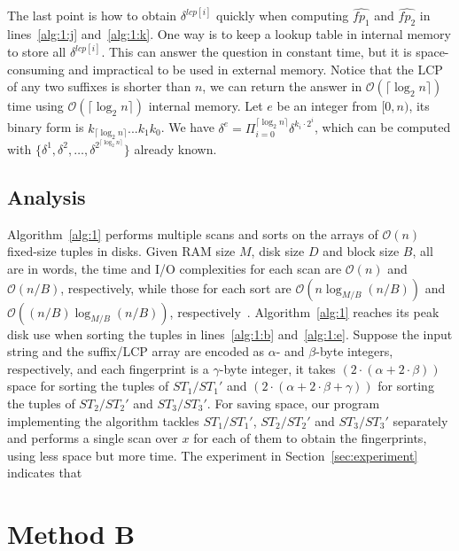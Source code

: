 \documentclass[10pt,journal,compsoc]{IEEEtran}
\begin{document}
The last point is how to obtain $\delta^{lcp[i]}$ quickly when computing $\hat{fp_1}$ and $\hat{fp_2}$ in lines~\ref{alg:1:j} and~\ref{alg:1:k}. One way is to keep a lookup table in internal memory to store all $\delta^{lcp[i]}$. This can answer the question in constant time, but it is space-consuming and impractical to be used in external memory. Notice that the LCP of any two suffixes is shorter than $n$, we can return the answer in $\mathcal{O}(\lceil \log_2{n} \rceil)$ time using $\mathcal{O}(\lceil \log_2{n} \rceil)$ internal memory. Let $e$ be an integer from $[0, n)$, its binary form is $k_{\lceil \log_2{n} \rceil}...k_1k_0$. We have $\delta^e = \Pi_{i = 0}^{\lceil \log_2{n} \rceil}{\delta}^{k_i \cdot 2^i}$, which can be computed with $\{{\delta}^{1}, {\delta}^{2}, \dots, {\delta}^{2^{\lceil \log_2{n} \rceil}} \}$ already known.

\subsection{Analysis} \label{sec:method1:analysis}


Algorithm~\ref{alg:1} performs multiple scans and sorts on the arrays of $\mathcal{O}(n)$ fixed-size tuples in disks. Given RAM size $M$, disk size $D$ and block size $B$, all are in words, the time and I/O complexities for each scan are $\mathcal{O}(n)$ and $\mathcal{O}(n / B)$, respectively, while those for each sort are $\mathcal{O}(n\log_{M/ B}(n / B))$ and $\mathcal{O}((n / B)\log_{M / B}(n / B))$, respectively~\cite{Arge2013}. Algorithm~\ref{alg:1} reaches its peak disk use when sorting the tuples in lines~\ref{alg:1:b} and~\ref{alg:1:e}. Suppose the input string and the suffix/LCP array are encoded as $\alpha$- and $\beta$-byte integers, respectively, and each fingerprint is a $\gamma$-byte integer, it takes $(2 \cdot (\alpha +2 \cdot \beta))$ space for sorting the tuples of $ST_1/ST_1'$ and $(2 \cdot (\alpha + 2 \cdot \beta + \gamma))$ for sorting the tuples of $ST_2/ST_2'$ and $ST_3/ST_3'$. For saving space, our program implementing the algorithm tackles $ST_1/ST_1'$, $ST_2/ST_2'$ and $ST_3/ST_3'$ separately and performs a single scan over $x$ for each of them to obtain the fingerprints, using less space but more time. The experiment in Section~\ref{sec:experiment} indicates that {\color{red}{the disk use is 40 times the size of $x$.}}

\section{Method B} \label{sec:method2}
\end{document}
